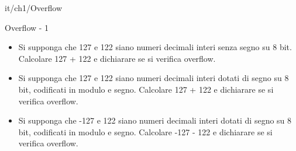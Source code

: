 \documentclass[11pt]{article}
\begin{document}
\begin{quiz}{it/ch1/Overflow}

\begin{cloze}[points=1,shuffle=false]{Overflow - 1}
\begin{itemize}
    \item Si supponga che 127 e 122 siano numeri decimali interi senza segno su 8 bit. Calcolare 127 + 122 e dichiarare se si verifica overflow. 
    \item Si supponga che 127 e 122 siano numeri decimali interi dotati di segno su 8 bit, codificati in modulo e segno. Calcolare 127 + 122 e dichiarare se si verifica overflow. 
    \item Si supponga che -127 e 122 siano numeri decimali interi dotati di segno su 8 bit, codificati in modulo e segno. Calcolare -127 - 122 e dichiarare se si verifica overflow.
\end{itemize}
\end{cloze}


\end{quiz}
\end{document}
